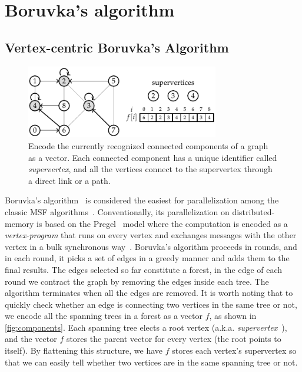 \documentclass{sokendai_thesis} %
\newcommand{\boruvka}[0]{Boruvka}
\begin{document}
\section{Boruvka's algorithm}

\subsection{Vertex-centric \boruvka{}'s Algorithm}
\label{sec:boruvka}

\begin{figure}
\centering
\includegraphics[width=0.75\textwidth]{figures/components.pdf}
\caption{Encode the currently recognized connected components of a graph as a vector. Each connected component has a unique identifier called \emph{supervertex}, and all the vertices connect to the supervertex through a direct link or a path.}
\vspace{-8pt}
\label{fig:components}
\end{figure}

\boruvka{}'s algorithm~\cite{boruvka} is considered the easiest for parallelization among the classic MSF algorithms~\cite{boruvka,kruskal,prim}.
Conventionally, its parallelization on distributed-memory is based on the Pregel~\cite{pregel} model where the computation is encoded as a \textit{vertex-program} that runs on every vertex and exchanges messages with the other vertex in a bulk synchronous way~\cite{bsp}.
\boruvka{}'s algorithm proceeds in rounds, and in each round, it picks a set of edges in a greedy manner and adds them to the final results.
The edges selected so far constitute a forest, in the edge of each round we contract the graph by removing the edges inside each tree.
The algorithm terminates when all the edges are removed.
It is worth noting that to quickly check whether an edge is connecting two vertices in the same tree or not, we encode all the spanning trees in a forest as a vector $f$, as shown in \autoref{fig:components}.
Each spanning tree elects a root vertex (a.k.a. \emph{supervertex}~\cite{salihoglu2014optimizing}), and the vector $f$ stores the parent vector for every vertex (the root points to itself). %
By flattening this structure, we have $f$ stores each vertex's supervertex so that we can easily tell whether two vertices are in the same spanning tree or not.
\end{document}
